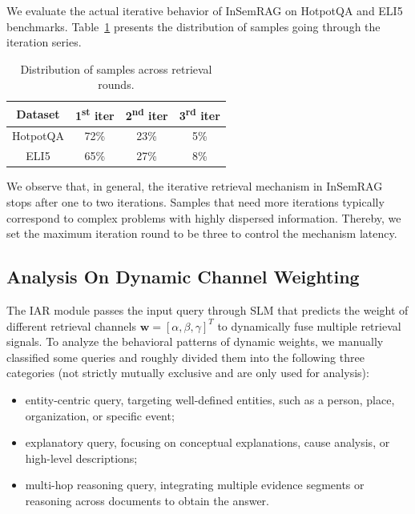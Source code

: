 We evaluate the actual iterative behavior of InSemRAG on HotpotQA and ELI5 benchmarks.
Table~\ref{tab:iter} presents the distribution of samples going through the iteration series.

\begin{table}[!htb]
\small
    \centering
    \begin{tabular}{|c|c|c|c|}
    \hline
        \textbf{Dataset} & \textbf{1\textsuperscript{st} iter} & \textbf{2\textsuperscript{nd} iter} & \textbf{3\textsuperscript{rd} iter} \\
        \hline
        HotpotQA & 72\% & 23\% & 5\% \\
        ELI5 & 65\% & 27\% & 8\% \\
        \hline
    \end{tabular}
    \caption{Distribution of samples across retrieval rounds.}
    \label{tab:iter}
\end{table}

\noindent
We observe that, in general, the iterative retrieval mechanism in InSemRAG stops after one to two iterations.
Samples that need more iterations typically correspond to complex problems with highly dispersed information.
Thereby, we set the maximum iteration round to be three to control the mechanism latency.




\subsection{Analysis On Dynamic Channel Weighting}\label{sec:weight}
The IAR module passes the input query through SLM that predicts the weight of different retrieval channels $\textbf{w}=\left[\alpha,\beta,\gamma\right]^T$ to dynamically fuse multiple retrieval signals.
To analyze the behavioral patterns of dynamic weights, we manually classified some queries and roughly divided them into the following three categories (not strictly mutually exclusive and are only used for analysis):
\begin{itemize}
    \item entity-centric query, targeting well-defined entities, such as a person, place, organization, or specific event;
    \item explanatory query, focusing on conceptual explanations, cause analysis, or high-level descriptions;
    \item multi-hop reasoning query, integrating multiple evidence segments or reasoning across documents to obtain the answer.
\end{itemize}


